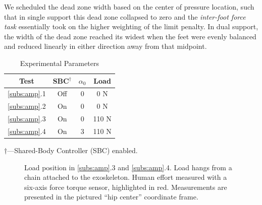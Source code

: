 \documentclass[utf8]{frontiersSCNS}
\begin{document}
We scheduled the dead zone width based on the center of pressure location, such that in single support this dead zone collapsed to zero and the \emph{inter-foot force task} essentially took on the higher weighting of the limit penalty. In dual support, the width of the dead zone reached its widest when the feet were evenly balanced and reduced linearly in either direction away from that midpoint. 

\begin{table}\centering
\begin{tabular}{cccc}
			\toprule
			Test & SBC$^\dagger$ & $\alpha_0$ & Load\\
			\midrule
			\ref{subs:amp}.1 & Off & 0 & 0 N\\
			\ref{subs:amp}.2 & On & 0 & 0 N\\
			\ref{subs:amp}.3 & On & 0 & 110 N\\
			\ref{subs:amp}.4 & On & 3 & 110 N\\
			\bottomrule
		\end{tabular}
		
		\scriptsize$\dagger$---Shared-Body Controller (SBC) enabled.
		\caption{Experimental Parameters}\label{tab:expparam}
\end{table}

\begin{figure}[t]
\centering
		\def\svgwidth{1.6in}
		

	\caption{Load position in \ref{subs:amp}.3 and \ref{subs:amp}.4. Load hangs from a chain attached to the exoskeleton. Human effort measured with a six-axis force torque sensor, highlighted in red. Measurements are presented in the pictured ``hip center'' coordinate frame.}\label{fig:experimental_condition}
\end{figure}
\end{document}
